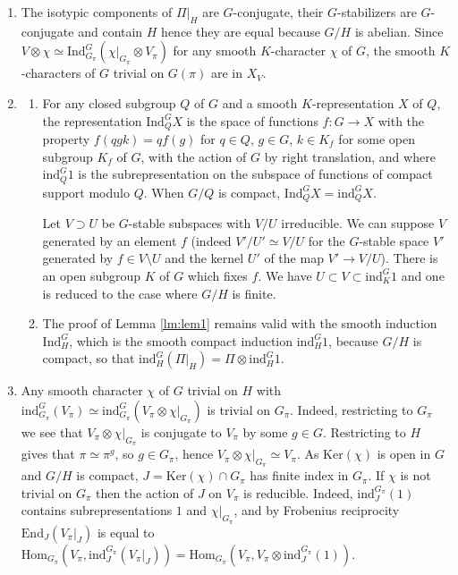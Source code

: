 \documentclass{article}
\begin{document}
\begin{Proof}
\begin{enumerate}
\item The isotypic components of \(\Pi|_H\) are \(G\)-conjugate, their \(G\)-stabilizers are \(G\)-conjugate and contain \(H\) hence they are equal because \(G/H\) is abelian. Since \(V \otimes \chi \simeq \mathrm{Ind}_{G_{\pi}}^G(\chi|_{G_{\pi}} \otimes V_{\pi})\) for any smooth \(K\)-character \(\chi\) of \(G\), the smooth \(K\)-characters of \(G\) trivial on \(G(\pi)\) are in \(X_V\).

\item
\begin{enumerate}
\item[(a)] For any closed subgroup \(Q\) of \(G\) and a smooth \(K\)-representation \(X\) of \(Q\), the representation \(\mathrm{Ind}_Q^G X\) is the space of functions \(f: G \to X\) with the property \(f(qgk) = qf(g)\) for \(q \in Q\), \(g \in G\), \(k \in K_f\) for some open subgroup \(K_f\) of \(G\), with the action of \(G\) by right translation, and where \(\mathrm{ind}_Q^G 1\) is the subrepresentation on the subspace of functions of compact support modulo \(Q\). When \(G/Q\) is compact, \(\mathrm{Ind}_Q^G X = \mathrm{ind}_Q^G X\).

Let \(V \supset U\) be \(G\)-stable subspaces with \(V/U\) irreducible. We can suppose \(V\) generated by an element \(f\) (indeed \(V'/U' \simeq V/U\) for the \(G\)-stable space \(V'\) generated by \(f \in V \setminus U\) and the kernel \(U'\) of the map \(V' \to V/U\)). There is an open subgroup \(K\) of \(G\) which fixes \(f\). We have \(U \subset V \subset \mathrm{ind}_K^G 1\) and one is reduced to the case where \(G/H\) is finite.

\item[(b)] The proof of Lemma \ref{lm:lem1} remains valid with the smooth induction \(\mathrm{Ind}_H^G\), which is the smooth compact induction \(\mathrm{ind}_H^G 1\), because \(G/H\) is compact, so that \(\mathrm{ind}_H^G(\Pi|_H) = \Pi \otimes \mathrm{ind}_H^G 1\).
\end{enumerate}

\item Any smooth character \(\chi\) of \(G\) trivial on \(H\) with \(\mathrm{ind}_{G_{\pi}}^G(V_{\pi}) \simeq \mathrm{ind}_{G_{\pi}}^G(V_{\pi} \otimes \chi|_{G_{\pi}})\) is trivial on \(G_{\pi}\). Indeed, restricting to \(G_{\pi}\) we see that \(V_{\pi} \otimes \chi|_{G_{\pi}}\) is conjugate to \(V_{\pi}\) by some \(g \in G\). Restricting to \(H\) gives that \(\pi \simeq \pi^g\), so \(g \in G_{\pi}\), hence \(V_{\pi} \otimes \chi|_{G_{\pi}} \simeq V_{\pi}\). As \(\mathrm{Ker}(\chi)\) is open in \(G\) and \(G/H\) is compact, \(J = \mathrm{Ker}(\chi) \cap G_{\pi}\) has finite index in \(G_{\pi}\). If \(\chi\) is not trivial on \(G_{\pi}\) then the action of \(J\) on \(V_{\pi}\) is reducible. Indeed, \(\mathrm{ind}_{J}^{G_{\pi}}(1)\) contains subrepresentations \(1\) and \(\chi|_{G_{\pi}}\), and by Frobenius reciprocity \(\mathrm{End}_J(V_{\pi}|_J)\) is equal to \(\mathrm{Hom}_{G_{\pi}}(V_{\pi}, \mathrm{ind}_J^{G_{\pi}}(V_{\pi}|_J)) = \mathrm{Hom}_{G_{\pi}}(V_{\pi}, V_{\pi} \otimes \mathrm{ind}_J^{G_{\pi}}(1))\).


\end{enumerate}
\end{Proof}
\end{document}
